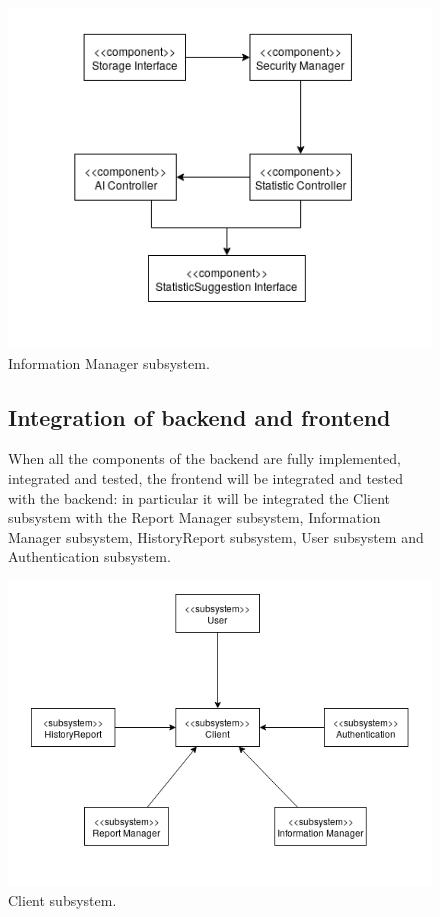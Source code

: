 \documentclass{report}
\begin{document}
\begin{figure}[!ht]
	\begin{center}
	\includegraphics[width=\textwidth]{img/InfoSub.png}
    \end{center}
    \label{fig:InfoSub}
	\caption{Information Manager subsystem.}
\end{figure}


\begin{figure}[!ht]
    \subsection{Integration of backend and frontend}
    When all the components of the backend are fully implemented, integrated and tested, the frontend will be integrated and tested with the backend: in particular it will be integrated the Client subsystem with the Report Manager subsystem, Information Manager subsystem, HistoryReport subsystem, User subsystem and Authentication subsystem. 
    \vspace{1cm}
    \begin{center}
	\includegraphics[width=\textwidth]{img/ClientSub.png}
    \end{center}
    \label{fig:ClientSub}
	\caption{Client subsystem.}
\end{figure}
\end{document}
